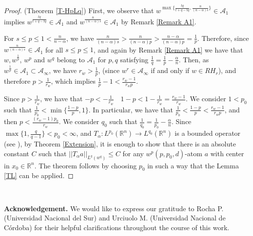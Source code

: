 \documentclass[a4paper,12pt,reqno]{amsart}
\numberwithin{equation}{section}
\begin{document}
	
	\begin{proof}{(Theorem \ref{T-HpLq})}
		First, we observe that $w^{\max\{\frac{tq}{t+q-tq},\frac{n}{(n-\alpha)s}\}} \in \mathcal{A}_1$ implies $w^{\frac{tq}{t+q-tq}} \in \mathcal{A}_1$ and $w^{\frac{n}{(n-\alpha)s}} \in \mathcal{A}_1$ by Remark \ref{Remark A1}.
		
		For $s\leq p \leq 1<\frac{n}{n-\alpha}$, we have $\frac{n}{(n-\alpha)s}>\frac{n}{(n-\alpha)p}>\frac{n-\alpha}{(n-\alpha)p} = \frac{1}{p}$. Therefore, since  $w^{\frac{n}{(n-\alpha)s}} \in \mathcal{A}_1$  for all $s \leq p \leq 1$, and again by Remark \ref{Remark A1} we have that $w, w^{\frac{1}{p}}$, $w^{p}$ and $w^{q}$ belong to $\mathcal{A}_1$ for $p,q$ satisfying $\frac{1}{q}=\frac{1}{p}-\frac{\alpha}{n}$.
		Then, as $w^{\frac{1}{p}} \in \mathcal{A}_1 \subset \mathcal{A}_{\infty}$, we have $r_w>\frac{1}{p}$, (since $w^{r} \in \mathcal{A}_{\infty}$ if and only if $w \in RH_r$), and therefore $p>\frac{1}{r_w}$, which implies $\frac{1}{p}-1<\frac{r_w-1}{r_wp}$.
		
		Since $p>\frac{1}{r_w}$, we have that $-p<-\frac{1}{r_w} \quad 1-p <1-\frac{1}{r_w}=\frac{r_w-1}{r_w}$. We consider $1 < p_0$ such that  $\frac{1}{p_0} < \min\{\frac{1-p}{p},1\}$.
		In particular, we have that $\frac{1}{p_0} < \frac{1-p}{p} < \frac{r_w-1}{r_wp}$, and then $p < \frac{(r_w-1)p_0}{r_w}$. We consider $q_0$ such that $\frac{1}{q_0}=\frac{1}{p_0}-\frac{\alpha}{n}$. Since $\max\{1,\frac{q}{q-1}\} <p_0<\infty$, and $T_{\alpha}: L^{p_0}(\mathbb{R}^{n}) \rightarrow L^{q_0}(\mathbb{R}^{n})$ is a bounded operator (see \cite{FR}), by Theorem \ref{Extension}, it is enough to show that there is an absolute constant $C$ such that $||T_\alpha a||_{L^q(w^q)}\leq C$ for any $w^p(p,p_0, d)$-atom $a$ with center in $x_0 \in \mathbb{R}^{n}$. The theorem follows by choosing $p_0$ in such a way that the Lemma \ref{TL} can be applied.
		
		
		
	\end{proof}
	
	
	
	
	\ 
	
	\textbf{Acknowledgement.} We would like to express our gratitude to Rocha P.(Universidad Nacional del Sur) and Urciuolo M. (Universidad Nacional de Córdoba) for their helpful clarifications throughout the course of this work.
	
\end{document}
